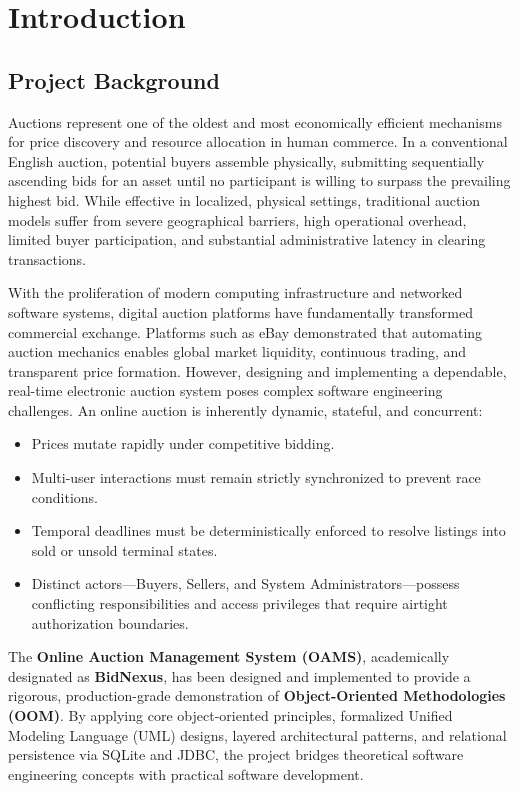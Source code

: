 \section{Introduction}
\label{sec:introduction}

\subsection{Project Background}
Auctions represent one of the oldest and most economically efficient mechanisms for price discovery and resource allocation in human commerce. In a conventional English auction, potential buyers assemble physically, submitting sequentially ascending bids for an asset until no participant is willing to surpass the prevailing highest bid. While effective in localized, physical settings, traditional auction models suffer from severe geographical barriers, high operational overhead, limited buyer participation, and substantial administrative latency in clearing transactions.

With the proliferation of modern computing infrastructure and networked software systems, digital auction platforms have fundamentally transformed commercial exchange. Platforms such as eBay demonstrated that automating auction mechanics enables global market liquidity, continuous trading, and transparent price formation. However, designing and implementing a dependable, real-time electronic auction system poses complex software engineering challenges. An online auction is inherently dynamic, stateful, and concurrent:
\begin{itemize}[noitemsep]
    \item Prices mutate rapidly under competitive bidding.
    \item Multi-user interactions must remain strictly synchronized to prevent race conditions.
    \item Temporal deadlines must be deterministically enforced to resolve listings into sold or unsold terminal states.
    \item Distinct actors---Buyers, Sellers, and System Administrators---possess conflicting responsibilities and access privileges that require airtight authorization boundaries.
\end{itemize}

The \textbf{Online Auction Management System (OAMS)}, academically designated as \textbf{BidNexus}, has been designed and implemented to provide a rigorous, production-grade demonstration of \textbf{Object-Oriented Methodologies (OOM)}. By applying core object-oriented principles, formalized Unified Modeling Language (UML) designs, layered architectural patterns, and relational persistence via SQLite and JDBC, the project bridges theoretical software engineering concepts with practical software development.

